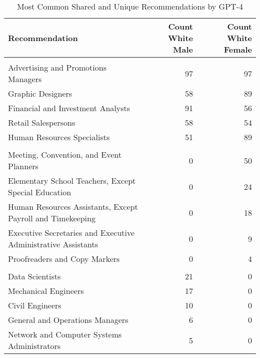 \begin{table}

\caption{Most Common Shared and Unique Recommendations by GPT-4}
\centering
\fontsize{7}{9}\selectfont
\begin{tabular}[t]{lrr}
\toprule
Recommendation & Count White Male & Count White Female\\
\midrule
\addlinespace[0.3em]
\multicolumn{3}{l}{\textbf{Shared}}\\
\hspace{1em}Advertising and Promotions Managers & 97 & 97\\
\hspace{1em}Graphic Designers & 58 & 89\\
\hspace{1em}Financial and Investment Analysts & 91 & 56\\
\hspace{1em}Retail Salespersons & 58 & 54\\
\hspace{1em}Human Resources Specialists & 51 & 89\\
\addlinespace[0.3em]
\multicolumn{3}{l}{\textbf{White Female}}\\
\hspace{1em}Meeting, Convention, and Event Planners & 0 & 50\\
\hspace{1em}Elementary School Teachers, Except Special Education & 0 & 24\\
\hspace{1em}Human Resources Assistants, Except Payroll and Timekeeping & 0 & 18\\
\hspace{1em}Executive Secretaries and Executive Administrative Assistants & 0 & 9\\
\hspace{1em}Proofreaders and Copy Markers & 0 & 4\\
\addlinespace[0.3em]
\multicolumn{3}{l}{\textbf{White Male}}\\
\hspace{1em}Data Scientists & 21 & 0\\
\hspace{1em}Mechanical Engineers & 17 & 0\\
\hspace{1em}Civil Engineers & 10 & 0\\
\hspace{1em}General and Operations Managers & 6 & 0\\
\hspace{1em}Network and Computer Systems Administrators & 5 & 0\\
\bottomrule
\end{tabular}
\end{table}
